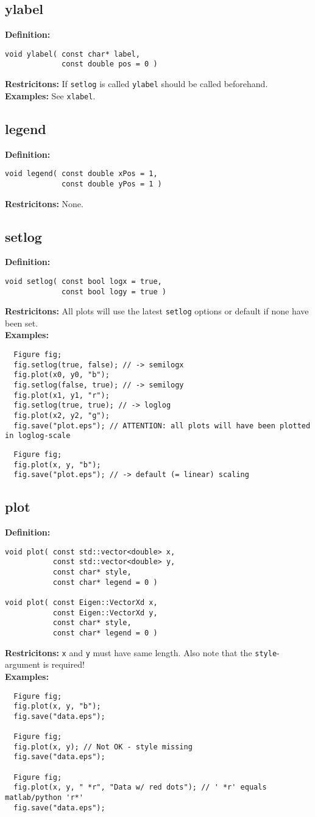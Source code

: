 \documentclass[a4paper]{article}
\newcommand{\command}[1]{\subsection{#1}}
\begin{document}
\command{ylabel}

\textbf{Definition:}
\begin{lstlisting}
void ylabel( const char* label, 
             const double pos = 0 )
\end{lstlisting}
%
\textbf{Restricitons:} If \texttt{setlog} is called \texttt{ylabel} should be called beforehand. \\
%
\textbf{Examples:} See \texttt{xlabel}.

\command{legend}

\textbf{Definition:}
\begin{lstlisting}
void legend( const double xPos = 1, 
             const double yPos = 1 )
\end{lstlisting}
%
\textbf{Restricitons:} None. 

\command{setlog}

\textbf{Definition:}
\begin{lstlisting}
void setlog( const bool logx = true, 
             const bool logy = true )
\end{lstlisting}
%
\textbf{Restricitons:} All plots will use the latest \texttt{setlog} options or default if none have been set. \\
%
\textbf{Examples:}
\begin{lstlisting}
  Figure fig;
  fig.setlog(true, false); // -> semilogx
  fig.plot(x0, y0, "b"); 
  fig.setlog(false, true); // -> semilogy
  fig.plot(x1, y1, "r");
  fig.setlog(true, true); // -> loglog
  fig.plot(x2, y2, "g");
  fig.save("plot.eps"); // ATTENTION: all plots will have been plotted in loglog-scale 
\end{lstlisting}
\begin{lstlisting}
  Figure fig;
  fig.plot(x, y, "b");
  fig.save("plot.eps"); // -> default (= linear) scaling
\end{lstlisting}


\command{plot} 

\textbf{Definition:} 
\begin{lstlisting}
void plot( const std::vector<double> x, 
           const std::vector<double> y, 
           const char* style, 
           const char* legend = 0 ) 

void plot( const Eigen::VectorXd x, 
           const Eigen::VectorXd y, 
           const char* style, 
           const char* legend = 0 )
\end{lstlisting}
\textbf{Restricitons:} \texttt{x} and \texttt{y} must have same length. Also note that the \texttt{style}-argument is required! \\
%
\textbf{Examples:}
\begin{lstlisting}
  Figure fig;
  fig.plot(x, y, "b");
  fig.save("data.eps");

  Figure fig;
  fig.plot(x, y); // Not OK - style missing
  fig.save("data.eps");

  Figure fig;
  fig.plot(x, y, " *r", "Data w/ red dots"); // ' *r' equals matlab/python 'r*'
  fig.save("data.eps");
\end{lstlisting}
\end{document}
